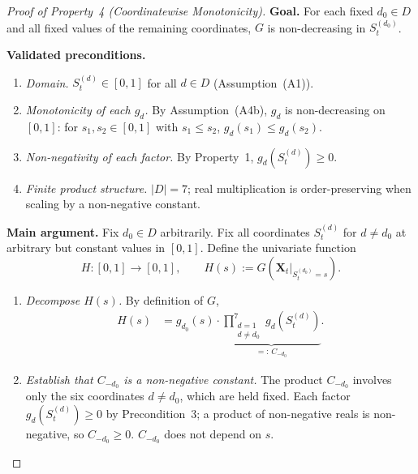 \documentclass[12pt,openany]{book}
\numberwithin{equation}{chapter}
\theoremstyle{plain}
\theoremstyle{definition}
\theoremstyle{remark}
\def\mathcal#1{#1}%
\begin{document}
\begin{proof}[Proof of Property~4 (Coordinatewise Monotonicity)]
\textbf{Goal.}  For each fixed $d_0\in\mathcal{D}$ and all
fixed values of the remaining coordinates, $G$ is
non-decreasing in $\mathcal{S}_t^{(d_0)}$.

\medskip\noindent
\textbf{Validated preconditions.}
\begin{enumerate}
  \item \emph{Domain.}
        $\mathcal{S}_t^{(d)}\in[0,1]$ for all
        $d\in\mathcal{D}$ (Assumption~(A1)).
  \item \emph{Monotonicity of each $g_d$.}
        By Assumption~(A4b), $g_d$ is non-decreasing on
        $[0,1]$: for $s_1,s_2\in[0,1]$ with $s_1\leq s_2$,
        $g_d(s_1)\leq g_d(s_2)$.
  \item \emph{Non-negativity of each factor.}
        By Property~1, $g_d\!\left(\mathcal{S}_t^{(d)}\right)\geq 0$.
  \item \emph{Finite product structure.}
        $|\mathcal{D}|=7$; real multiplication is order-preserving
        when scaling by a non-negative constant.
\end{enumerate}

\medskip\noindent
\textbf{Main argument.}
Fix $d_0\in\mathcal{D}$ arbitrarily.  Fix all coordinates
$\mathcal{S}_t^{(d)}$ for $d\neq d_0$ at arbitrary but
constant values in $[0,1]$.  Define the univariate function
\begin{equation}
  H : [0,1] \to [0,1],
  \qquad
  H(s) := G\!\left(\mathbf{X}_t\big|_{\mathcal{S}_t^{(d_0)}=s}\right).
  \label{eq:P4-H-def}
\end{equation}

\begin{enumerate}
  \item \emph{Decompose $H(s)$.}
        By definition of $G$,
        \begin{align}
          H(s)
          &= g_{d_0}(s)
             \cdot
             \underbrace{
               \prod_{\substack{d=1\\d\neq d_0}}^{7}
                 g_d\!\left(\mathcal{S}_t^{(d)}\right)
             }_{=:\,C_{-d_0}}.
          \label{eq:P4-decompose}
        \end{align}

  \item \emph{Establish that $C_{-d_0}$ is a non-negative constant.}
        The product $C_{-d_0}$ involves only the six coordinates
        $d\neq d_0$, which are held fixed.  Each factor
        $g_d\!\left(\mathcal{S}_t^{(d)}\right)\geq 0$
        by Precondition~3; a product of non-negative reals
        is non-negative, so $C_{-d_0}\geq 0$.
        $C_{-d_0}$ does not depend on $s$.


\end{enumerate}
\end{proof}
\end{document}
